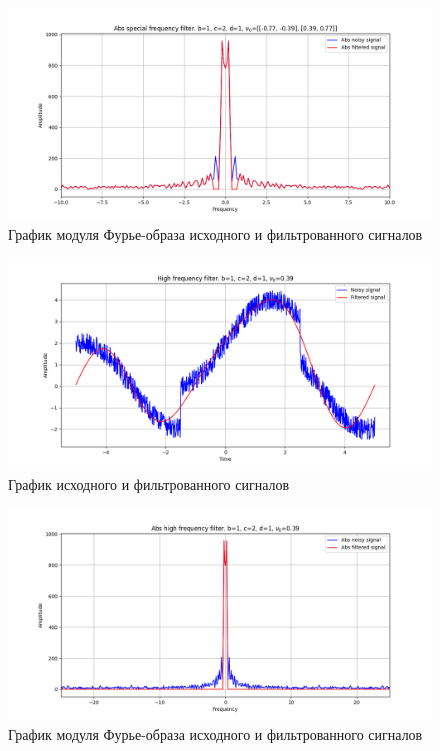 \documentclass[a4paper, 12pt]{article}
\begin{document}
    \begin{figure}[!htb]
        \centering
        \includegraphics[scale=0.485]{1_abs_u_U_nospec.png}
        \captionsetup{skip=0pt}
        \caption{График модуля Фурье-образа исходного и фильтрованного сигналов}
        \label{fig:fig72}
    \end{figure}
    \begin{figure}[!htb]
        \centering
        \includegraphics[scale=0.485]{1_1_u_flt_u_nospec.png}
        \captionsetup{skip=0pt}
        \caption{График исходного и фильтрованного сигналов}
        \label{fig:fig73}
    \end{figure}
    \begin{figure}[!htb]
        \centering
        \includegraphics[scale=0.485]{1_1_abs_u_U_nospec.png}
        \captionsetup{skip=0pt}
        \caption{График модуля Фурье-образа исходного и фильтрованного сигналов}
        \label{fig:fig74}
    \end{figure}
\end{document}
